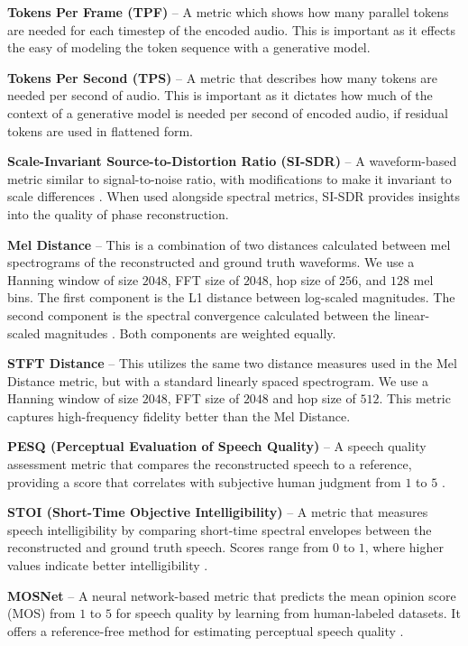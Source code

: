 \documentclass{article} %
\begin{document}
    \textbf{Tokens Per Frame (TPF)} \--- A metric which shows how many parallel tokens are needed for each timestep of the encoded audio. This is important as it effects the easy of modeling the token sequence with a generative model.

    \textbf{Tokens Per Second (TPS)} \--- A metric that describes how many tokens are needed per second of audio. This is important as it dictates how much of the context of a generative model is needed per second of encoded audio, if residual tokens are used in flattened form.    

    \textbf{Scale-Invariant Source-to-Distortion Ratio (SI-SDR)} \--- A waveform-based metric similar to signal-to-noise ratio, with modifications to make it invariant to scale differences \citep{le2019sdr}. When used alongside spectral metrics, SI-SDR provides insights into the quality of phase reconstruction.

    \textbf{Mel Distance} \--- This is a combination of two distances calculated between mel spectrograms of the reconstructed and ground truth waveforms. We use a Hanning window of size $2048$, FFT size of $2048$, hop size of $256$, and $128$ mel bins. The first component is the L1 distance between log-scaled magnitudes. The second component is the spectral convergence calculated between the linear-scaled magnitudes \citep{steinmetz2020auraloss}. Both components are weighted equally.
    
    \textbf{STFT Distance} \--- This utilizes the same two distance measures used in the Mel Distance metric, but with a standard linearly spaced spectrogram. We use a Hanning window of size $2048$, FFT size of $2048$ and hop size of $512$. This metric captures high-frequency fidelity better than the Mel Distance.

    \textbf{PESQ (Perceptual Evaluation of Speech Quality)} \--- A speech quality assessment metric that compares the reconstructed speech to a reference, providing a score that correlates with subjective human judgment from $1$ to $5$ \citep{rix2001perceptual}.
    
    \textbf{STOI (Short-Time Objective Intelligibility)} \--- A metric that measures speech intelligibility by comparing short-time spectral envelopes between the reconstructed and ground truth speech. Scores range from $0$ to $1$, where higher values indicate better intelligibility \citep{andersen2017non}.
    
    \textbf{MOSNet} \--- A neural network-based metric that predicts the mean opinion score (MOS) from $1$ to $5$ for speech quality by learning from human-labeled datasets. It offers a reference-free method for estimating perceptual speech quality \citep{lo2019mosnet}.
\end{document}
